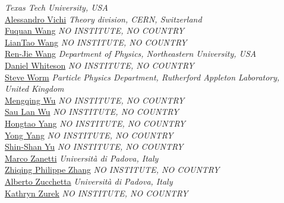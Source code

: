 \emph{Texas Tech University, USA}\\
\noindent\href{mailto:alessandro.vichi@cern.ch}{Alessandro Vichi} 
\emph{Theory division, CERN, Switzerland }\\
\noindent\href{mailto:Fuquan.Wang@cern.ch}{Fuquan Wang} 
\emph{NO INSTITUTE, NO COUNTRY}\\
\noindent\href{mailto:liantaow@uchicago.edu}{LianTao Wang} 
\emph{NO INSTITUTE, NO COUNTRY}\\
\noindent\href{mailto:renjie.wang@cern.ch}{Ren-Jie Wang} 
\emph{Department of Physics, Northeastern University, USA}\\
\noindent\href{mailto:daniel@uci.edu}{Daniel Whiteson} 
\emph{NO INSTITUTE, NO COUNTRY}\\
\noindent\href{mailto:steven.worm@cern.ch}{Steve Worm} 
\emph{Particle Physics Department, Rutherford Appleton Laboratory, United Kingdom}\\
\noindent\href{mailto:mengqing.wu@cern.ch}{Mengqing Wu} 
\emph{NO INSTITUTE, NO COUNTRY}\\
\noindent\href{mailto:sau.lan.wu@cern.ch}{Sau Lan Wu} 
\emph{NO INSTITUTE, NO COUNTRY}\\
\noindent\href{mailto:Hongtao.Yang@cern.ch}{Hongtao Yang} 
\emph{NO INSTITUTE, NO COUNTRY}\\
\noindent\href{mailto:Yong.Yang@cern.ch}{Yong Yang} 
\emph{NO INSTITUTE, NO COUNTRY}\\
\noindent\href{mailto:Shin-Shan.Yu@cern.ch}{Shin-Shan Yu} 
\emph{NO INSTITUTE, NO COUNTRY}\\
\noindent\href{mailto:marco.zanetti@cern.ch}{Marco Zanetti} 
\emph{Universit\`a di Padova, Italy}\\
\noindent\href{mailto:zhangzq@lal.in2p3.fr}{Zhiqing Philippe Zhang} 
\emph{NO INSTITUTE, NO COUNTRY}\\
\noindent\href{mailto:a.zucchetta@cern.ch}{Alberto Zucchetta} 
\emph{Universit\`a di Padova, Italy}\\
\noindent\href{mailto:kzurek@berkeley.edu}{Kathryn Zurek} 
\emph{NO INSTITUTE, NO COUNTRY}\\
